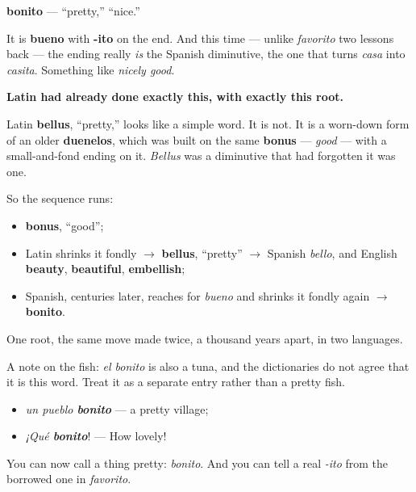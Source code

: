 \begin{cousinweb}
\textbf{bonito} — \textquotedblleft{}pretty,\textquotedblright{} \textquotedblleft{}nice.\textquotedblright{}

It is \textbf{bueno} with \textbf{-ito} on the end. And this time — unlike \emph{favorito} two lessons back — the ending really \emph{is} the Spanish diminutive, the one that turns \emph{casa} into \emph{casita}. Something like \emph{nicely good}.

\textbf{Latin had already done exactly this, with exactly this root.}

Latin \textbf{bellus}, \textquotedblleft{}pretty,\textquotedblright{} looks like a simple word. It is not. It is a worn-down form of an older \textbf{duenelos}, which was built on the same \textbf{bonus} — \emph{good} — with a small-and-fond ending on it. \emph{Bellus} was a diminutive that had forgotten it was one.

So the sequence runs:

\begin{itemize}
\raggedright
  \item \textbf{bonus}, \textquotedblleft{}good\textquotedblright{};
  \item Latin shrinks it fondly $\to$ \textbf{bellus}, \textquotedblleft{}pretty\textquotedblright{} $\to$ Spanish \emph{bello}, and English \textbf{beauty}, \textbf{beautiful}, \textbf{embellish};
  \item Spanish, centuries later, reaches for \emph{bueno} and shrinks it fondly again $\to$ \textbf{bonito}.
\end{itemize}

One root, the same move made twice, a thousand years apart, in two languages.

A note on the fish: \emph{el bonito} is also a tuna, and the dictionaries do not agree that it is this word. Treat it as a separate entry rather than a pretty fish.

\begin{itemize}
\raggedright
  \item \emph{un pueblo \textbf{bonito}} — a pretty village;
  \item \emph{¡Qué \textbf{bonito}}! — How lovely!
\end{itemize}
\end{cousinweb}

\begin{grammarlens}[title={What you've built}]
You can now call a thing pretty: \emph{bonito}. And you can tell a real \emph{-ito} from the borrowed one in \emph{favorito}.
\end{grammarlens}

